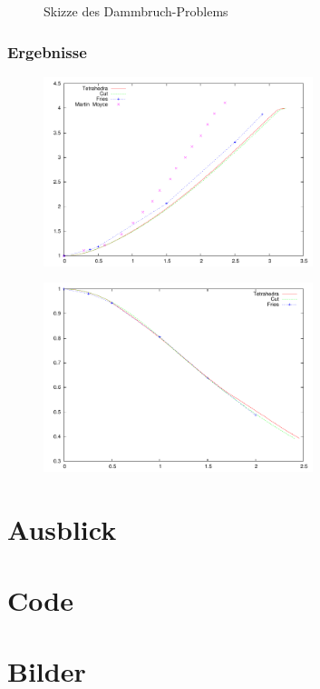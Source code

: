 \def\svgwidth{0.6\textwidth}
\begin{figure}[ht]
\centering
  \caption{Skizze des Dammbruch-Problems}
\end{figure}

\subsection{Ergebnisse}
\begin{figure}
 \includegraphics[width=0.7\textwidth]{pics/diagrams/plot}
\caption{}
\end{figure} 

\begin{figure}
 \includegraphics[width=0.7\textwidth]{pics/diagrams/plotheight}
\caption{}
\end{figure} 


\chapter{Ausblick}

\appendix

\chapter{Code}
\chapter{Bilder}

\clearpage
{}





